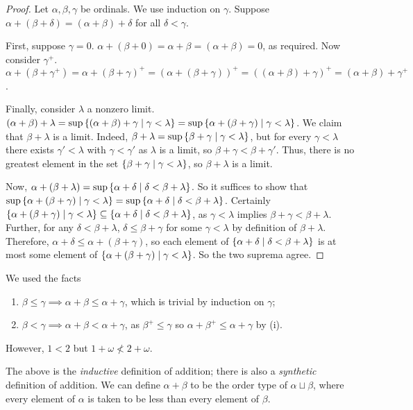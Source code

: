 \begin{proof}
    Let \( \alpha, \beta, \gamma \) be ordinals.
    We use induction on \( \gamma \).
    Suppose \( \alpha + (\beta + \delta) = (\alpha + \beta) + \delta \) for all \( \delta < \gamma \).

    First, suppose \( \gamma = 0 \).
    \( \alpha + (\beta + 0) = \alpha + \beta = (\alpha + \beta) = 0 \), as required.
    Now consider \( \gamma^+ \).
    \( \alpha + (\beta + \gamma^+) = \alpha + (\beta + \gamma)^+ = (\alpha + (\beta + \gamma))^+ = ((\alpha + \beta) + \gamma)^+ = (\alpha + \beta) + \gamma^+ \).

    Finally, consider \( \lambda \) a nonzero limit.
    \( (\alpha + \beta) + \lambda = \sup \qty{(\alpha + \beta) + \gamma \mid \gamma < \lambda} = \sup \qty{\alpha + (\beta + \gamma) \mid \gamma < \lambda} \).
    We claim that \( \beta + \lambda \) is a limit.
    Indeed, \( \beta + \lambda = \sup\qty{\beta + \gamma \mid \gamma < \lambda} \), but for every \( \gamma < \lambda \) there exists \( \gamma' < \lambda \) with \( \gamma < \gamma' \) as \( \lambda \) is a limit, so \( \beta + \gamma < \beta + \gamma' \).
    Thus, there is no greatest element in the set \( \qty{\beta + \gamma \mid \gamma < \lambda} \), so \( \beta + \lambda \) is a limit.

    Now, \( \alpha + (\beta + \lambda) = \sup\qty{\alpha + \delta \mid \delta < \beta + \lambda} \).
    So it suffices to show that \( \sup\qty{\alpha + (\beta + \gamma) \mid \gamma < \lambda} = \sup\qty{\alpha + \delta \mid \delta < \beta + \lambda} \).
    Certainly \( \qty{\alpha + (\beta + \gamma) \mid \gamma < \lambda} \subseteq \qty{\alpha + \delta \mid \delta < \beta + \lambda} \), as \( \gamma < \lambda \) implies \( \beta + \gamma < \beta + \lambda \).
    Further, for any \( \delta < \beta + \lambda \), \( \delta \leq \beta + \gamma \) for some \( \gamma < \lambda \) by definition of \( \beta + \lambda \).
    Therefore, \( \alpha + \delta \leq \alpha + (\beta + \gamma) \), so each element of \( \qty{\alpha + \delta \mid \delta < \beta + \lambda} \) is at most some element of \( \qty{\alpha + (\beta + \gamma) \mid \gamma < \lambda} \).
    So the two suprema agree.
\end{proof}
\begin{remark}
    We used the facts
    \begin{enumerate}
        \item \( \beta \leq \gamma \implies \alpha + \beta \leq \alpha + \gamma \), which is trivial by induction on \( \gamma \);
        \item \( \beta < \gamma \implies \alpha + \beta < \alpha + \gamma \), as \( \beta^+ \leq \gamma \) so \( \alpha + \beta^+ \leq \alpha + \gamma \) by (i).
    \end{enumerate}
    However, \( 1 < 2 \) but \( 1 + \omega \not < 2 + \omega \).
\end{remark}
The above is the \emph{inductive} definition of addition; there is also a \emph{synthetic} definition of addition.
We can define \( \alpha + \beta \) to be the order type of \( \alpha \sqcup \beta \), where every element of \( \alpha \) is taken to be less than every element of \( \beta \).

